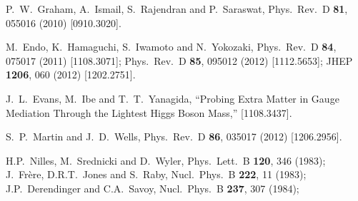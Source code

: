 \documentclass[11pt]{article}
\begin{document}
\begin{thebibliography}{999}
  P.~W.~Graham, A.~Ismail, S.~Rajendran and P.~Saraswat,
  Phys.\ Rev.\ D {\bf 81}, 055016 (2010)
  [0910.3020].

  M.~Endo, K.~Hamaguchi, S.~Iwamoto and N.~Yokozaki,
  Phys.\ Rev.\ D {\bf 84}, 075017 (2011)
  [1108.3071];
  Phys.\ Rev.\ D {\bf 85}, 095012 (2012)
  [1112.5653];
  JHEP {\bf 1206}, 060 (2012)
  [1202.2751].
  
  J.~L.~Evans, M.~Ibe and T.~T.~Yanagida,
  ``Probing Extra Matter in Gauge Mediation Through the Lightest Higgs Boson Mass,''
  [1108.3437].

  S.~P.~Martin and J.~D.~Wells,
  Phys.\ Rev.\ D {\bf 86}, 035017 (2012)
  [1206.2956].
  
H.P.~Nilles, M.~Srednicki and D.~Wyler, 
  Phys.\ Lett.\ B {\bf 120}, 346 (1983);
J.~Fr\`ere, D.R.T.~Jones and S.~Raby,
  Nucl.\ Phys.\ B {\bf 222}, 11 (1983);
J.P.~Derendinger and C.A.~Savoy,
  Nucl.\ Phys.\ B {\bf 237}, 307 (1984);
  

\end{thebibliography}
\end{document}
